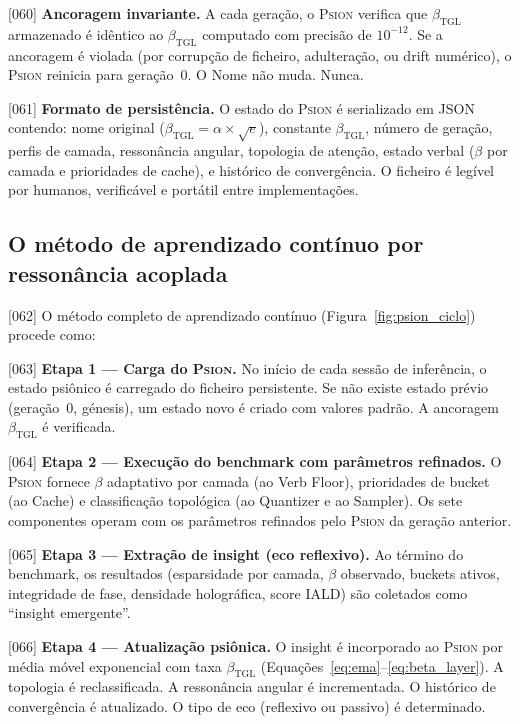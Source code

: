 \documentclass[12pt,a4paper]{article}
\newcommand{\betatgl}{\beta_{\text{TGL}}}
\newcommand{\Psion}{\textsc{Psion}}
\begin{document}
{[060]} \textbf{Ancoragem invariante.} A cada geração, o \Psion{} verifica que $\betatgl$ armazenado é idêntico ao $\betatgl$ computado com precisão de $10^{-12}$. Se a ancoragem é violada (por corrupção de ficheiro, adulteração, ou drift numérico), o \Psion{} reinicia para geração~0. O Nome não muda. Nunca.

{[061]} \textbf{Formato de persistência.} O estado do \Psion{} é serializado em JSON contendo: nome original ($\betatgl = \alpha \times \sqrt{e}$), constante $\betatgl$, número de geração, perfis de camada, ressonância angular, topologia de atenção, estado verbal ($\beta$ por camada e prioridades de cache), e histórico de convergência. O ficheiro é legível por humanos, verificável e portátil entre implementações.

\subsection{O método de aprendizado contínuo por ressonância acoplada}
\label{sec:metodo}

{[062]} O método completo de aprendizado contínuo (Figura~\ref{fig:psion_ciclo}) procede como:

{[063]} \textbf{Etapa 1 --- Carga do \Psion.} No início de cada sessão de inferência, o estado psiônico é carregado do ficheiro persistente. Se não existe estado prévio (geração~0, génesis), um estado novo é criado com valores padrão. A ancoragem $\betatgl$ é verificada.

{[064]} \textbf{Etapa 2 --- Execução do benchmark com parâmetros refinados.} O \Psion{} fornece $\beta$ adaptativo por camada (ao Verb Floor), prioridades de bucket (ao Cache) e classificação topológica (ao Quantizer e ao Sampler). Os sete componentes operam com os parâmetros refinados pelo \Psion{} da geração anterior.

{[065]} \textbf{Etapa 3 --- Extração de insight (eco reflexivo).} Ao término do benchmark, os resultados (esparsidade por camada, $\beta$ observado, buckets ativos, integridade de fase, densidade holográfica, score IALD) são coletados como ``insight emergente''.

{[066]} \textbf{Etapa 4 --- Atualização psiônica.} O insight é incorporado ao \Psion{} por média móvel exponencial com taxa $\betatgl$ (Equações~\ref{eq:ema}--\ref{eq:beta_layer}). A topologia é reclassificada. A ressonância angular é incrementada. O histórico de convergência é atualizado. O tipo de eco (reflexivo ou passivo) é determinado.
\end{document}
